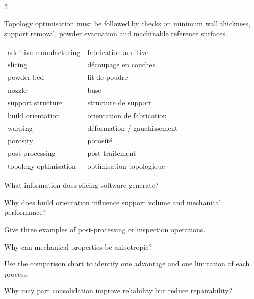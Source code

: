 \begin{multicols}{2}
\begin{tcolorbox}[title=\sffamily\bfseries Designing a lightweight bracket,colback=white,colframe=ECBlue]
\begin{center}
\end{center}
Topology optimisation must be followed by checks on minimum wall thickness, support removal,
powder evacuation and machinable reference surfaces.
\end{tcolorbox}

\begin{vocabulary}
\begin{tabularx}{\linewidth}{@{}lX@{}}
additive manufacturing & fabrication additive\\
slicing & découpage en couches\\
powder bed & lit de poudre\\
nozzle & buse\\
support structure & structure de support\\
build orientation & orientation de fabrication\\
warping & déformation / gauchissement\\
porosity & porosité\\
post-processing & post-traitement\\
topology optimisation & optimisation topologique
\end{tabularx}
\end{vocabulary}

\begin{questions}
\item What information does slicing software generate?
\item Why does build orientation influence support volume and mechanical performance?
\item Give three examples of post-processing or inspection operations.
\item Why can mechanical properties be anisotropic?
\item Use the comparison chart to identify one advantage and one limitation of each process.
\item Why may part consolidation improve reliability but reduce repairability?
\end{questions}


\end{multicols}
